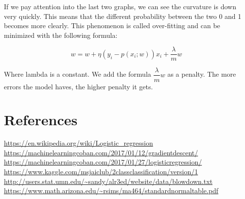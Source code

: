 \documentclass{article}
\begin{document}
If we pay attention into the last two graphs, we can see the curvature is down very quickly. This means that the different probability between the two 0 and 1 becomes more clearly. This phenomenon is called over-fitting and can be minimized with the following formula:

\begin{equation} 
    w = w + \eta(y_{i} - p(x_{i}; w))x_{i} + \dfrac{\lambda}{m} w
\end{equation}

Where lambda is a constant. We add the formula $\dfrac {\lambda} {m} w$ as a penalty. The more errors the model haves, the higher penalty it gets.

\section{References}
\url{https://en.wikipedia.org/wiki/Logistic_regression}
\\
\url{https://machinelearningcoban.com/2017/01/12/gradientdescent/}
\\
\url{https://machinelearningcoban.com/2017/01/27/logisticregression/}
\\
\url{https://www.kaggle.com/msjaiclub/2classclassification/version/1}
\\
\url{http://users.stat.umn.edu/~sandy/alr3ed/website/data/blowdown.txt}
\\
\url{https://www.math.arizona.edu/~rsims/ma464/standardnormaltable.pdf}
\end{document}
